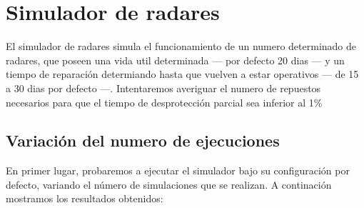 \chapter{Simulador de radares}

El simulador de radares simula el funcionamiento de un numero determinado de radares, que poseen una vida util determinada --- por defecto 20 dias --- y un tiempo de reparación determiando hasta que vuelven a estar operativos --- de 15 a 30 dias por defecto ---. Intentaremos averiguar el numero de repuestos necesarios para que el tiempo de desprotección parcial sea inferior al 1\%

\section{Variación del numero de ejecuciones}
En primer lugar, probaremos a ejecutar el simulador bajo su configuración por defecto, variando el número de simulaciones que se realizan. A continación mostramos los resultados obtenidos:


